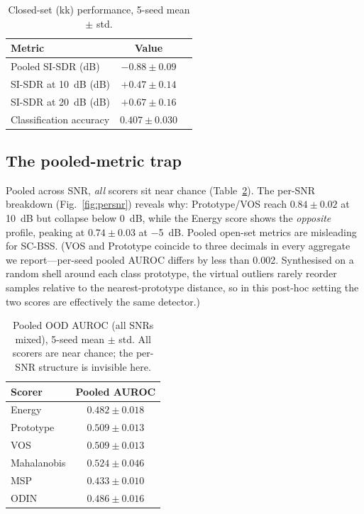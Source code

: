 \documentclass[review,12pt]{elsarticle}
\begin{document}
\begin{table}[H]
\centering
\caption{Closed-set (kk) performance, 5-seed mean $\pm$ std.}
\label{tab:closed}
\begin{tabular}{lcc}
\toprule
Metric & Value \\
\midrule
Pooled SI-SDR (dB) & $-0.88 \pm 0.09$ \\
SI-SDR at \SI{10}{dB} (dB) & $+0.47 \pm 0.14$ \\
SI-SDR at \SI{20}{dB} (dB) & $+0.67 \pm 0.16$ \\
Classification accuracy & $0.407 \pm 0.030$ \\
\bottomrule
\end{tabular}
\end{table}

\subsection{The pooled-metric trap}
\label{sec:trap}

Pooled across SNR, \emph{all} scorers sit near chance
(Table~\ref{tab:trap}). The per-SNR breakdown
(Fig.~\ref{fig:persnr}) reveals why: Prototype/VOS reach
$0.84 \pm 0.02$ at \SI{10}{dB} but collapse below \SI{0}{dB}, while the
Energy score shows the \emph{opposite} profile, peaking at
$0.74 \pm 0.03$ at \SI{-5}{dB}. Pooled open-set metrics are misleading
for SC-BSS. (VOS and Prototype coincide to three decimals in every
aggregate we report---per-seed pooled AUROC differs by less than
0.002. Synthesised on a random shell around each class prototype, the
virtual outliers rarely reorder samples relative to the
nearest-prototype distance, so in this post-hoc setting the two scores
are effectively the same detector.)

\begin{table}[H]
\centering
\caption{Pooled OOD AUROC (all SNRs mixed), 5-seed mean $\pm$ std.
All scorers are near chance; the per-SNR structure is invisible here.}
\label{tab:trap}
\begin{tabular}{lc}
\toprule
Scorer & Pooled AUROC \\
\midrule
Energy      & $0.482 \pm 0.018$ \\
Prototype   & $0.509 \pm 0.013$ \\
VOS         & $0.509 \pm 0.013$ \\
Mahalanobis & $0.524 \pm 0.046$ \\
MSP         & $0.433 \pm 0.010$ \\
ODIN        & $0.486 \pm 0.016$ \\
\bottomrule
\end{tabular}
\end{table}
\end{document}
